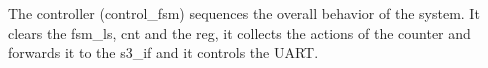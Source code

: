 The controller (control\_fsm) sequences the overall behavior of the system. It clears the fsm\_ls, cnt and the reg, it collects the actions of the counter and forwards it to the s3\_if and it controls the UART.